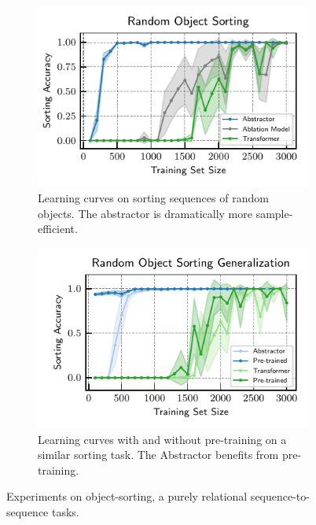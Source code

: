 \begin{figure}[ht]
    \centering
    \begin{subfigure}[t]{0.45\textwidth}
        \centering
        \vskip-7.5pt
        \includegraphics[width=\textwidth]{figures/experiments/random_object_sorting.pdf}
        \vskip-7.5pt
        \caption{Learning curves on sorting sequences of random objects. The abstractor is dramatically more sample-efficient.}\label{fig:exp_object_sorting}
    \end{subfigure}\hspace{\fill}
    \begin{subfigure}[t]{0.45\textwidth}
        \centering
        \vskip-7.5pt
        \includegraphics[width=\textwidth]{figures/experiments/random_object_sorting_generalization.pdf}
        \vskip-7.5pt
        \caption{Learning curves with and without pre-training on a similar sorting task. The Abstractor benefits from pre-training.}\label{fig:exp_object_sorting_generalization}
    \end{subfigure}
    \caption{Experiments on object-sorting, a purely relational sequence-to-sequence tasks.}\label{fig:experiments}
    \vskip-15pt
\end{figure}


